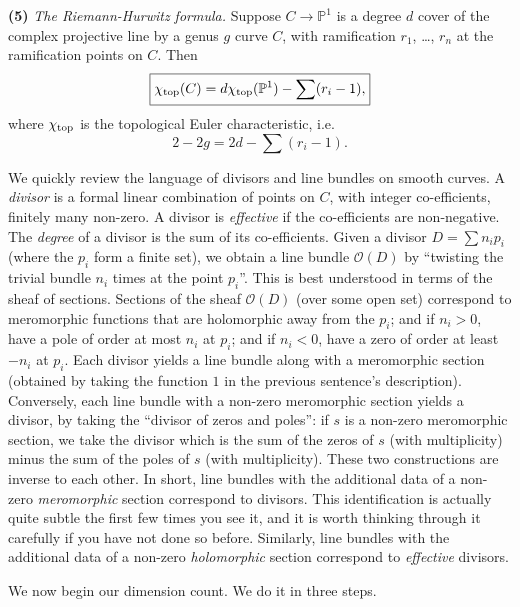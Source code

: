 \documentclass[12pt,letterpaper]{amsart}
\newcommand{\proj}{\mathbb P}
\newcommand{\oh}{{\mathcal{O}}}
\renewcommand{\top}{\rm{top}}
\newcommand{\lremind}[1]{{\bf[label:  #1]}}
\renewcommand{\lremind}[1]{{}}
\begin{document}
{\noindent
{\bf (5)} {\em The Riemann-Hurwitz formula.}  Suppose $C \rightarrow
\proj^1$ is a degree $d$ cover of the complex projective line by a
genus $g$ curve $C$, with ramification $r_1$, \dots, $r_n$ at the
ramification points on $C$.  Then
$$
\boxed{\chi_{\top}(C) = d \chi_{\top} (\proj^1) -
  \sum (r_i-1),}$$
 where $\chi_{\top}$ is the topological Euler
characteristic, i.e. \lremind{rh} 
\begin{equation}
\boxed{2-2g = 2d - \sum(r_i-1).}
\label{rh}\end{equation}

We quickly review the language of divisors and line bundles on smooth
curves.  A {\em divisor} is a formal linear combination of points on
$C$, with integer co-efficients, finitely many non-zero.  A divisor is
{\em effective} if the co-efficients are non-negative.  The {\em
  degree} of a divisor is the sum of its co-efficients. Given a
divisor $D = \sum n_i p_i$ (where the $p_i$ form a finite set), we
obtain a line bundle $\oh(D)$ by ``twisting the trivial bundle $n_i$
times at the point $p_i$''.  This is best understood in terms of the
sheaf of sections.  Sections of the sheaf $\oh(D)$ (over some open
set) correspond to meromorphic functions that are holomorphic away
from the $p_i$; and if $n_i>0$, have a pole of order at most $n_i$ at
$p_i$; and if $n_i<0$, have a zero of order at least $-n_i$ at $p_i$.
Each divisor yields a line bundle along with a meromorphic section
(obtained by taking the function $1$ in the previous sentence's
description).  Conversely, each line bundle with a non-zero
meromorphic section yields a divisor, by taking the ``divisor of zeros
and poles'': if $s$ is a non-zero meromorphic section, we take the
divisor which is the sum of the zeros of $s$ (with multiplicity) minus
the sum of the poles of $s$ (with multiplicity).  These two
constructions are inverse to each other.  In short, line bundles with
the additional data of a non-zero {\em meromorphic} section correspond
to divisors.  This identification is actually quite subtle the first
few times you see it, and it is worth thinking through it carefully if
you have not done so before.  Similarly, line bundles with the
additional data of a non-zero {\em holomorphic} section correspond to
{\em effective} divisors.

We now begin our dimension count.  We do it in three steps.

}
\end{document}
